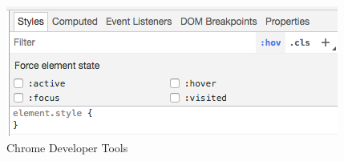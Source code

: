 \begin{figure}[h]
\caption{Chrome Developer Tools}
  \label{fig:tools}
\includegraphics{../images/tools}
\centering
\end{figure}
%
%
%
%
%

